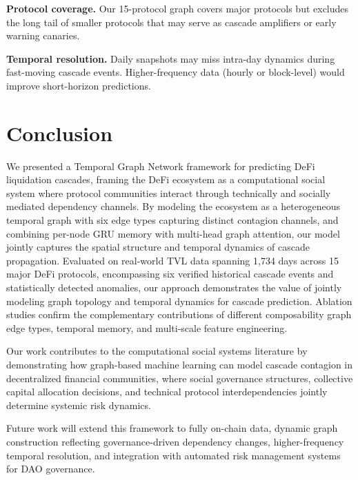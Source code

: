 \documentclass[journal]{IEEEtran}
\begin{document}
\textbf{Protocol coverage.} Our 15-protocol graph covers major protocols but excludes the long tail of smaller protocols that may serve as cascade amplifiers or early warning canaries.

\textbf{Temporal resolution.} Daily snapshots may miss intra-day dynamics during fast-moving cascade events. Higher-frequency data (hourly or block-level) would improve short-horizon predictions.


\section{Conclusion}

We presented a Temporal Graph Network framework for predicting DeFi liquidation cascades, framing the DeFi ecosystem as a computational social system where protocol communities interact through technically and socially mediated dependency channels.
By modeling the ecosystem as a heterogeneous temporal graph with six edge types capturing distinct contagion channels, and combining per-node GRU memory with multi-head graph attention, our model jointly captures the spatial structure and temporal dynamics of cascade propagation.
Evaluated on real-world TVL data spanning 1,734 days across 15 major DeFi protocols, encompassing six verified historical cascade events and statistically detected anomalies, our approach demonstrates the value of jointly modeling graph topology and temporal dynamics for cascade prediction.
Ablation studies confirm the complementary contributions of different composability graph edge types, temporal memory, and multi-scale feature engineering.

Our work contributes to the computational social systems literature by demonstrating how graph-based machine learning can model cascade contagion in decentralized financial communities, where social governance structures, collective capital allocation decisions, and technical protocol interdependencies jointly determine systemic risk dynamics.

Future work will extend this framework to fully on-chain data, dynamic graph construction reflecting governance-driven dependency changes, higher-frequency temporal resolution, and integration with automated risk management systems for DAO governance.




\end{document}
